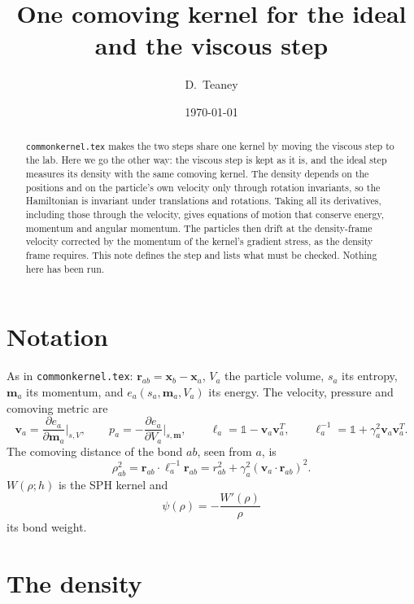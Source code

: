 \documentclass[11pt,aps,preprint,nofootinbib,superscriptaddress,tightenlines]{revtex4-2}
\def\st{\begin{equation}}
\def\stp{\end{equation}}
\newcommand{\one}{\mathds{1}}
\begin{document}
\title{One comoving kernel for the ideal and the viscous step}
\author{D.~Teaney}
\date{\today}

\begin{abstract}
\texttt{commonkernel.tex} makes the two steps share one kernel by moving the viscous step to the lab.
Here we go the other way: the viscous step is kept as it is, and the ideal step measures its density with
the same comoving kernel.  The density depends on the positions and on the particle's own velocity only
through rotation invariants, so the Hamiltonian is invariant under translations and rotations.  Taking all its
derivatives, including those through the velocity, gives equations of motion that conserve energy, momentum
and angular momentum.  The particles then drift at the density-frame velocity corrected by the momentum of the
kernel's gradient stress, as the density frame requires.  This note defines the step and lists what must be
checked.  Nothing here has been run.
\end{abstract}

\maketitle

\section{Notation}
\label{sec:notation}

As in \texttt{commonkernel.tex}: $\bm r_{ab}=\bm x_b-\bm x_a$, $V_a$ the particle volume, $s_a$ its entropy,
$\bm m_a$ its momentum, and $e_a(s_a,\bm m_a,V_a)$ its energy.  The velocity, pressure and comoving metric are
\st
\bm v_a=\frac{\partial e_a}{\partial\bm m_a}\Big|_{s,V},\qquad
p_a=-\frac{\partial e_a}{\partial V_a}\Big|_{s,\bm m},\qquad
\ell_a=\one-\bm v_a\bm v_a^T,\qquad \ell_a^{-1}=\one+\gamma_a^2\bm v_a\bm v_a^T .
\stp
The comoving distance of the bond $ab$, seen from $a$, is
\st
\rho_{ab}^2=\bm r_{ab}\cdot\ell_a^{-1}\bm r_{ab}=r_{ab}^2+\gamma_a^2(\bm v_a\cdot\bm r_{ab})^2 .
\stp
$W(\rho;h)$ is the SPH kernel and
\st
\psi(\rho)=-\frac{W'(\rho)}{\rho}
\stp
its bond weight.

\section{The density}
\label{sec:density}
\end{document}
